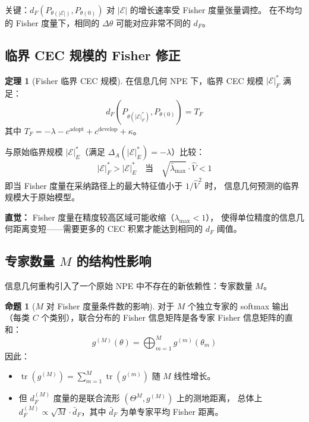 \documentclass[12pt,a4paper]{article}
\theoremstyle{definition}
\newtheorem{theorem}{定理}[section]
\newtheorem{proposition}{命题}[section]
\theoremstyle{remark}
\newcommand{\Fisher}{g}
\newcommand{\tr}{\operatorname{tr}}
\begin{document}
关键：$d_F(P_{\theta(|\mathcal{E}|)}, P_{\theta(0)})$ 对 $|\mathcal{E}|$ 的增长速率受 Fisher 度量张量调控。
在不均匀的 Fisher 度量下，相同的 $\Delta\theta$ 可能对应非常不同的 $d_F$。

\subsection{临界 CEC 规模的 Fisher 修正}

\begin{theorem}[Fisher 临界 CEC 规模]\label{thm:critical_cec_fisher}
在信息几何 NPE 下，临界 CEC 规模 $|\mathcal{E}|^*_F$ 满足：
\begin{equation}
    d_F(P_{\theta(|\mathcal{E}|^*_F)}, P_{\theta(0)}) = T_F \label{eq:critical_cec_def}
\end{equation}
其中 $T_F = -\lambda - c^{\text{adopt}} + c^{\text{develop}} + \kappa$。

与原始临界规模 $|\mathcal{E}|^*_E$（满足 $\Delta_A(|\mathcal{E}|^*_E) = -\lambda$）比较：
\begin{equation}
    |\mathcal{E}|^*_F > |\mathcal{E}|^*_E \quad \text{当} \quad \sqrt{\bar{\lambda}_{\max}} \cdot \hat{V} < 1 \label{eq:comparison_cec}
\end{equation}
即当 Fisher 度量在采纳路径上的最大特征值小于 $1/\hat{V}^2$ 时，
信息几何预测的临界规模大于原始模型。

\textbf{直觉：} Fisher 度量在精度较高区域可能收缩（$\lambda_{\max} < 1$），
使得单位精度的信息几何距离变短——需要更多的 CEC 积累才能达到相同的 $d_F$ 阈值。
\end{theorem}

\subsection{专家数量 $M$ 的结构性影响}

信息几何重构引入了一个原始 NPE 中不存在的新依赖性：专家数量 $M$。

\begin{proposition}[$M$ 对 Fisher 度量条件数的影响]\label{prop:M_dependence}
对于 $M$ 个独立专家的 softmax 输出（每类 $C$ 个类别），联合分布的 Fisher 信息矩阵是各专家 Fisher 信息矩阵的直和：
\begin{equation}
    \Fisher^{(M)}(\theta) = \bigoplus_{m=1}^{M} \Fisher^{(m)}(\theta_m) \label{eq:joint_fisher}
\end{equation}
因此：
\begin{itemize}
    \item $\tr(\Fisher^{(M)}) = \sum_{m=1}^{M} \tr(\Fisher^{(m)})$ 随 $M$ 线性增长。
    \item 但 $d_F^{(M)}$ 度量的是联合流形 $(\Theta^M, \Fisher^{(M)})$ 上的测地距离，
    总体上 $d_F^{(M)} \propto \sqrt{M} \cdot \bar{d}_F$，其中 $\bar{d}_F$ 为单专家平均 Fisher 距离。
\end{itemize}
\end{proposition}
\end{document}
